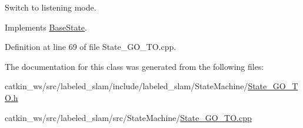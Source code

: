 Switch to listening mode. 



Implements \hyperlink{class_base_state_ac65db46601f60cd025ff058dae117d7c}{Base\+State}.



Definition at line 69 of file State\+\_\+\+G\+O\+\_\+\+T\+O.\+cpp.



The documentation for this class was generated from the following files\+:\begin{DoxyCompactItemize}
\item 
catkin\+\_\+ws/src/labeled\+\_\+slam/include/labeled\+\_\+slam/\+State\+Machine/\hyperlink{_state___g_o___t_o_8h}{State\+\_\+\+G\+O\+\_\+\+T\+O.\+h}\item 
catkin\+\_\+ws/src/labeled\+\_\+slam/src/\+State\+Machine/\hyperlink{_state___g_o___t_o_8cpp}{State\+\_\+\+G\+O\+\_\+\+T\+O.\+cpp}\end{DoxyCompactItemize}
